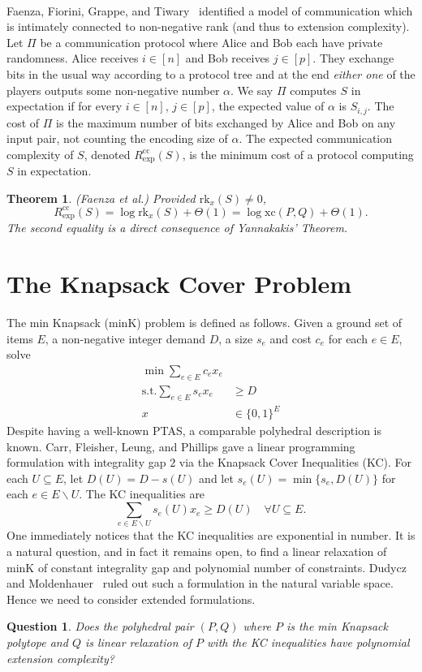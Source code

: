 \documentclass[letterpaper,12pt,oneside,onecolumn]{article}
\newtheorem{theorem}[fact]{Theorem}
\newtheorem{question}[fact]{Question}
\begin{document}
\paragraph{}
Faenza, Fiorini, Grappe, and Tiwary~\cite{faenza2015extended} identified a model of communication which is intimately connected to non-negative rank (and thus to extension complexity). Let $\Pi$ be a communication protocol where Alice and Bob each have private randomness. Alice receives $i \in [n]$ and Bob receives $j \in [p]$. They exchange bits in the usual way according to a protocol tree and at the end \emph{either one} of the players outputs some non-negative number $\alpha$. We say $\Pi$ computes $S$ in expectation if for every $i \in [n]$, $j \in [p]$, the expected value of $\alpha$ is $S_{i,j}$. The cost of $\Pi$ is the maximum number of bits exchanged by Alice and Bob on any input pair, not counting the encoding size of $\alpha$. The expected communication complexity of $S$, denoted $R^\text{cc}_{\text{exp}}(S)$, is the minimum cost of a protocol computing $S$ in expectation.
\begin{theorem}\label{th:communication}(Faenza et al.) Provided $\text{rk}_x(S) \neq 0$, $$R^\text{cc}_{\text{exp}}(S) = \log \text{rk}_x(S) + \Theta(1) = \log\text{xc}(P,Q) + \Theta(1).$$
The second equality is a direct consequence of Yannakakis' Theorem. 
\end{theorem}
\section{The Knapsack Cover Problem}
The min Knapsack (minK) problem is defined as follows. Given a ground set of items $E$, a non-negative integer demand $D$, a size $s_e$ and cost $c_e$ for each $e \in E$,  solve
\begin{align*}
    \min \sum_{e \in E} c_ex_e&\\
    \text{s.t.} \sum_{e \in E} s_ex_e &\geq D \\
    x&\in \{0,1\}^E
\end{align*}
Despite having a well-known PTAS, a comparable polyhedral description is known. Carr, Fleisher, Leung, and Phillips \cite{carr1999strengthening} gave a linear programming formulation with integrality gap $2$ via the Knapsack Cover Inequalities (KC). For each $U \subseteq E$, let $D(U) = D-s(U)$ and let $s_e(U) =\min\{s_e, D(U)\}$ for each $e \in E\backslash U$. The KC inequalities are
$$ \sum_{e \in E\backslash U} s_e(U) x_e \geq D(U)\quad \forall U\subseteq E.$$
One immediately notices that the KC inequalities are exponential in number. It is a natural question, and in fact it remains open, to find a linear relaxation of minK of constant integrality gap and polynomial number of constraints. Dudycz and Moldenhauer~\cite{dudycz2015approximated} ruled out such a formulation in the natural variable space. Hence we need to consider extended formulations.
\begin{question}\label{question:big}
Does the polyhedral pair $(P,Q)$ where $P$ is the min Knapsack polytope and $Q$ is linear relaxation of $P$ with the KC inequalities have polynomial extension complexity?
\end{question}
\end{document}
